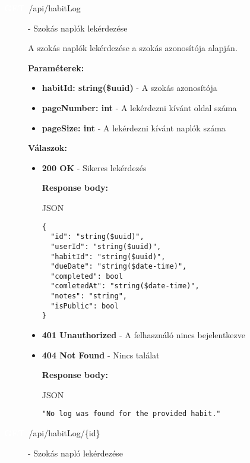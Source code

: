 \documentclass[12pt]{report}
\newcommand{\httpGet}[1]{\colorbox{getColor}{\textbf{\textcolor{white}{GET}}}~#1}
\begin{document}
\begin{description}
  \item[\httpGet{/api/habitLog}] - Szokás naplók lekérdezése
  
    \vspace{0.5cm}
    A szokás naplók lekérdezése a szokás azonosítója alapján.

    \vspace{0.5cm}
    \textbf{Paraméterek:}
    \begin{itemize}
      \item \textbf{habitId: string(\$uuid)} - A szokás azonosítója
      \item \textbf{pageNumber: int} - A lekérdezni kívánt oldal száma
      \item \textbf{pageSize: int} - A lekérdezni kívánt naplók száma
    \end{itemize}

    \vspace{0.5cm}
    \textbf{Válaszok:}
    \begin{itemize}
      \item \textbf{200 OK} - Sikeres lekérdezés

        \textbf{Response body:}
        \begin{codeblock}{JSON}
          \begin{verbatim}
{
  "id": "string($uuid)",
  "userId": "string($uuid)",
  "habitId": "string($uuid)",
  "dueDate": "string($date-time)",
  "completed": bool
  "comletedAt": "string($date-time)",
  "notes": "string",
  "isPublic": bool
}
          \end{verbatim}
        \end{codeblock}

      \item \textbf{401 Unauthorized} - A felhasználó nincs bejelentkezve

      \item \textbf{404 Not Found} - Nincs találat
      
        \textbf{Response body:}
        \begin{codeblock}{JSON}
          \begin{verbatim}
"No log was found for the provided habit."
          \end{verbatim}
        \end{codeblock}
    \end{itemize}

  \item[\httpGet{/api/habitLog/\{id\}}] - Szokás napló lekérdezése
  

\end{description}
\end{document}
